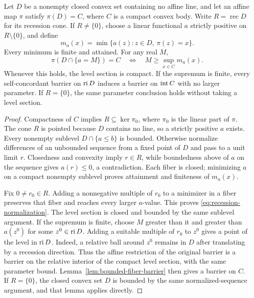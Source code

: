 \begin{proposition}
\label{prop:recession-normalization}
Let $D$ be a nonempty closed convex set containing no affine line,
and let an affine map $\pi$ satisfy $\pi(D)=C$, where $C$ is a compact
convex body. Write $R=\operatorname{rec}D$ for its recession cone.
If $R\ne\{0\}$, choose a linear functional $a$ strictly positive on
$R\setminus\{0\}$, and define
\[
 m_a(x)=\min\{a(z):z\in D,\ \pi(z)=x\}.
\]
Every minimum is finite and attained. For any real $M$,
\begin{equation}\label{eq:recession-normalization}
 \pi(D\cap\{a=M\})=C
 \quad\Longleftrightarrow\quad M\geq\sup_{x\in C}m_a(x).
\end{equation}
Whenever this holds, the level section is compact. If the supremum is
finite, every self-concordant barrier on $\operatorname{ri} D$ induces a barrier on
$\operatorname{int} C$ with no larger parameter. If $R=\{0\}$, the same parameter
conclusion holds without taking a level section.
\end{proposition}
\begin{proof}
Compactness of $C$ implies $R\subseteq\ker\pi_0$, where $\pi_0$ is
the linear part of $\pi$. The cone $R$ is pointed because $D$ contains
no line, so a strictly positive $a$ exists. Every nonempty sublevel
$D\cap\{a\leq b\}$ is bounded. Otherwise normalize differences of an
unbounded sequence from a fixed point of $D$ and pass to a unit limit
$r$. Closedness and convexity imply $r\in R$, while boundedness above
of $a$ on the sequence gives $a(r)\leq0$, a contradiction. Each fiber
is closed; minimizing $a$ on a compact nonempty sublevel proves
attainment and finiteness of $m_a(x)$.

Fix $0\ne r_0\in R$. Adding a nonnegative multiple of $r_0$ to a
minimizer in a fiber preserves that fiber and reaches every larger
$a$-value. This proves \eqref{eq:recession-normalization}. The level
section is closed and bounded by the same sublevel argument.
If the supremum is finite, choose $M$ greater than it and greater than
$a(z^0)$ for some $z^0\in\operatorname{ri} D$. Adding a suitable multiple of $r_0$
to $z^0$ gives a point of the level in $\operatorname{ri} D$. Indeed, a relative
ball around $z^0$ remains in $D$ after translating by a recession
direction. Thus the affine restriction of the original barrier is a
barrier on the relative interior of the compact level section, with
the same parameter bound. Lemma~\ref{lem:bounded-fiber-barrier} then
gives a barrier on $C$. If $R=\{0\}$, the closed convex set $D$ is
bounded by the same normalized-sequence argument, and that lemma
applies directly.
\end{proof}

